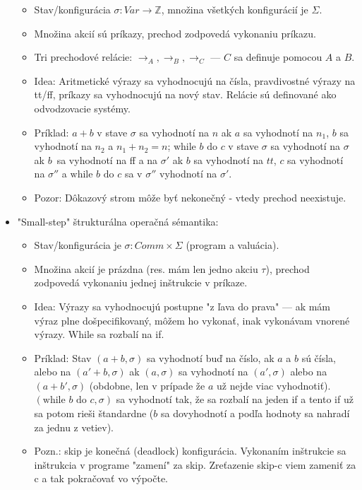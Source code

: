 \documentclass[paper=a4, fontsize=11pt]{scrartcl} %
\numberwithin{equation}{section} %
\numberwithin{figure}{section} %
\numberwithin{table}{section} %
\begin{document}
\begin{itemize}
		\begin{itemize}
			\item Stav/konfigurácia $\sigma : Var \to \mathbb{Z}$, množina všetkých konfigurácií je $\Sigma$.
			\item Množina akcií sú príkazy, prechod zodpovedá vykonaniu príkazu.
			\item Tri prechodové relácie: $\to_A, \to_B, \to_C$ — $C$ sa definuje pomocou $A$ a $B$.
			\item Idea: Aritmetické výrazy sa vyhodnocujú na čísla, pravdivostné výrazy na tt/ff, príkazy sa vyhodnocujú na nový stav. Relácie sú definované ako odvodzovacie systémy.
			\item Príklad: $a + b$ v stave $\sigma$ sa vyhodnotí na $n$ ak $a$ sa vyhodnotí na $n_1$, $b$ sa vyhodnotí na $n_2$ a $n_1 + n_2 = n$; $\text{while } b \text{ do } c$ v stave $\sigma$ sa vyhodnotí na $\sigma$ ak $b$ sa vyhodnotí na ff a na $\sigma'$ ak $b$ sa vyhodnotí na $tt$, $c$ sa vyhodnotí na $\sigma''$ a $\text{while } b \text{ do } c$ sa v $\sigma''$ vyhodnotí na $\sigma'$.
			\item Pozor: Dôkazový strom môže byť nekonečný - vtedy prechod neexistuje.			
		\end{itemize}
	
		\item "Small-step" štrukturálna operačná sémantika:
		
		\begin{itemize}
			\item Stav/konfigurácia je $\sigma : Comm \times \Sigma$ (program a valuácia).
			\item Množina akcií je prázdna (res. mám len jedno akciu $\tau$), prechod zodpovedá vykonaniu jednej inštrukcie v príkaze.
			\item Idea: Výrazy sa vyhodnocujú postupne "z ľava do prava" — ak mám výraz plne došpecifikovaný, môžem ho vykonať, inak vykonávam vnorené výrazy. While sa rozbalí na if.
			\item Príklad: Stav $(a + b, \sigma)$ sa vyhodnotí buď na číslo, ak $a$ a $b$ sú čísla, alebo na $(a' + b, \sigma)$ ak $(a, \sigma)$ sa vyhodnotí na $(a', \sigma)$ alebo na $(a + b', \sigma)$ (obdobne, len v prípade že $a$ už nejde viac vyhodnotiť). $(\text{while } b \text{ do } c, \sigma)$ sa vyhodnotí tak, že sa rozbalí na jeden if a tento if už sa potom rieši štandardne ($b$ sa dovyhodnotí a podľa hodnoty sa nahradí za jednu z vetiev).
			\item Pozn.: skip je konečná (deadlock) konfigurácia. Vykonaním inštrukcie sa inštrukcia v programe "zamení" za skip. Zreťazenie skip-c viem zameniť za c a tak pokračovať vo výpočte.
		\end{itemize}
	

\end{itemize}
\end{document}
